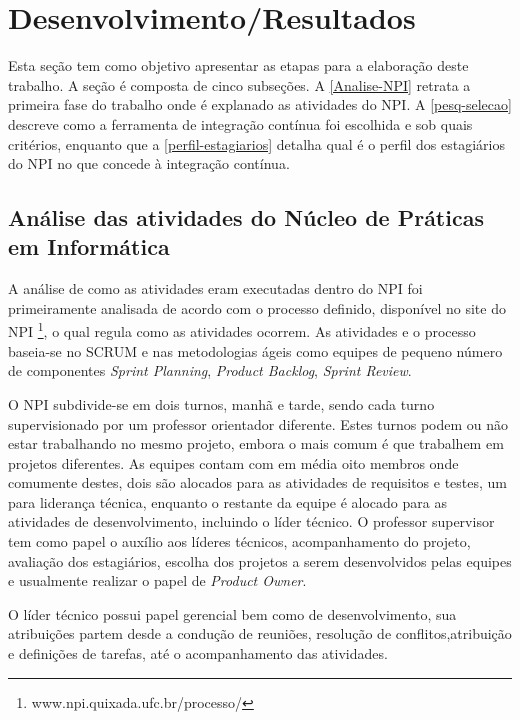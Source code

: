 \chapter{Desenvolvimento/Resultados}
Esta seção tem como objetivo apresentar as etapas para a elaboração deste trabalho. A seção é composta de cinco subseções. A \autoref{Analise-NPI} retrata a primeira fase do trabalho onde é explanado as atividades do NPI. A \autoref{pesq-selecao} descreve como a ferramenta de integração contínua foi escolhida e sob quais critérios, enquanto que a \autoref{perfil-estagiarios} detalha qual é o perfil dos estagiários do NPI no que concede à integração contínua.


\section{Análise das atividades do Núcleo de Práticas em Informática}\label{Analise-NPI}
A análise de como as atividades eram executadas dentro do NPI foi primeiramente analisada de acordo com o processo definido, disponível no site do NPI \footnote{www.npi.quixada.ufc.br/processo/}, o qual regula como as atividades ocorrem. As atividades e o processo baseia-se no SCRUM e nas metodologias ágeis como equipes de pequeno número de componentes \textit{Sprint Planning}, \textit{Product Backlog}, \textit{Sprint Review}.

O NPI subdivide-se em dois turnos, manhã e tarde, sendo cada turno supervisionado por um professor orientador diferente. Estes turnos podem ou não estar trabalhando no mesmo projeto, embora o mais comum é que trabalhem em projetos diferentes. As equipes contam com em média oito membros onde comumente destes, dois são alocados para as atividades de requisitos e testes, um para liderança técnica, enquanto o restante da equipe é alocado para as atividades de desenvolvimento, incluindo o líder técnico. O professor supervisor tem como papel o auxílio aos líderes técnicos, acompanhamento do projeto, avaliação dos estagiários, escolha dos projetos a serem desenvolvidos pelas equipes e usualmente realizar o papel de \textit{Product Owner}. 

O líder técnico possui papel gerencial bem como de desenvolvimento, sua atribuições partem desde a condução de reuniões, resolução de conflitos,atribuição e definições de tarefas, até o acompanhamento das atividades. 

